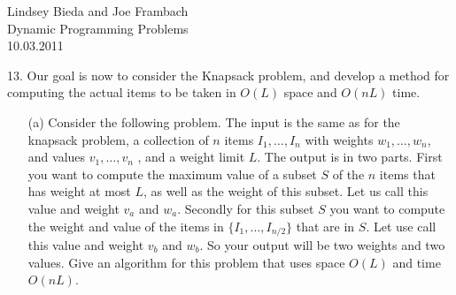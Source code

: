 \documentclass[10pt]{article}
\begin{document}
	\begin{flushright}
	Lindsey Bieda and Joe Frambach\\
	Dynamic Programming Problems\\
	10.03.2011
	\end{flushright}
	13.	Our goal is now to consider the Knapsack problem, and develop a method for computing the actual
			items to be taken in $O(L)$ space and $O(nL)$ time.
	\begin{enumerate}
		\item[(a)]	Consider the following problem. The input is the same as for the knapsack problem, a collection
								of $n$ items $I_1, \ldots, I_n$ with weights $w_1, \ldots, w_n$, and values $v_1, \ldots, v_n$ , and a weight limit $L$.  The
								output is in two parts.  First you want to compute the maximum value of a subset $S$ of the $n$
								items that has weight at most $L$, as well as the weight of this subset.  Let us call this value and
								weight $v_a$ and $w_a$.  Secondly for this subset $S$ you want to compute the weight and value of the
								items in $\{I_1, \ldots, I_{n/2}\}$ that are in $S$. Let use call this value and weight $v_b$ and $w_b$. So your output
								will be two weights and two values. Give an algorithm for this problem that uses space $O(L)$ and
								time $O(nL)$.\\
							

\end{enumerate}
\end{document}
